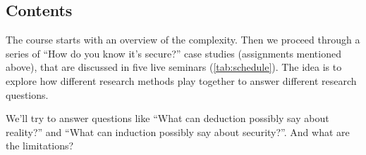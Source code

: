 \subsection{Contents}

The course starts with an overview of the complexity.
Then we proceed through a series of \enquote{How do you know it's secure?} case 
studies (assignments mentioned above), that are discussed in five live seminars
(\cref{tab:schedule}).
The idea is to explore how different research methods play together to answer 
different research questions.


We'll try to answer questions like
\enquote{What can deduction possibly say about reality?}
and \enquote{What can induction possibly say about security?}.
And what are the limitations?

